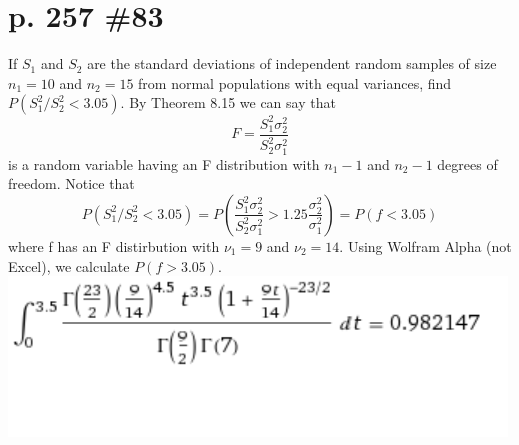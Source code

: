 \documentclass[12pt]{article}
\begin{document}
	\section[20pt]{p. 257 \#83}
	If \(S_1\) and \(S_2\) are the standard deviations of independent random samples of size \(n_1=10\) and \(n_2=15\) from normal populations with equal variances, find \(P(S_1^2/S_2^2<3.05)\). \newline \newline
	By Theorem 8.15 we can say that
	\[F=\frac{S_1^2\sigma_2^2}{S_2^2\sigma_1^2}\]
	is a random variable having an F distribution with \(n_1-1\) and \(n_2-1\) degrees of freedom. \newline
	Notice that
	\[P(S_1^2/S_2^2<3.05) = P(\frac{S_1^2\sigma_2^2}{S_2^2\sigma_1^2}>1.25\frac{\sigma_2^2}{\sigma_1^2})=P(f <3.05)\]
	where f has an F distirbution with \(\nu_1=9\) and \(\nu_2=14\).
	Using Wolfram Alpha (not Excel), we calculate \(P(f > 3.05)\).
	\newline \newline
	\includegraphics{spicy integral 2}
	\newline
\end{document}
